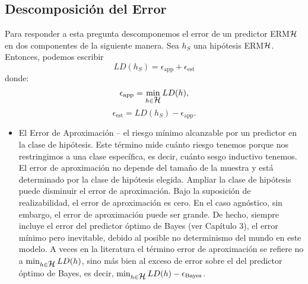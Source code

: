 \begin{teo}
\subsection*{Descomposición del Error}
Para responder a esta pregunta descomponemos el error de un predictor ERM$\mathop{\mbox{$\mathcal{H}$}}\nolimits$ en dos componentes de la siguiente manera. Sea $h_S$ una hipótesis ERM$\mathop{\mbox{$\mathcal{H}$}}\nolimits$. Entonces, podemos escribir
$$ LD(h_S) = \epsilon_{\text{app}} + \epsilon_{\text{est}} $$
donde:
$$ \epsilon_{\text{app}} = \min_{h \in \mathop{\mbox{$\mathcal{H}$}}\nolimits} LD(h), $$
$$ \epsilon_{\text{est}} = LD(h_S) - \epsilon_{\text{app}}. $$
\begin{itemize}
  \item El Error de Aproximación – el riesgo mínimo alcanzable por un predictor en la clase de hipótesis. Este término mide cuánto riesgo tenemos porque nos restringimos a una clase específica, es decir, cuánto sesgo inductivo tenemos. El error de aproximación no depende del tamaño de la muestra y está determinado por la clase de hipótesis elegida. Ampliar la clase de hipótesis puede disminuir el error de aproximación.
  Bajo la suposición de realizabilidad, el error de aproximación es cero. En el caso agnóstico, sin embargo, el error de aproximación puede ser grande.
  De hecho, siempre incluye el error del predictor óptimo de Bayes (ver Capítulo 3), el error mínimo pero inevitable, debido al posible no determinismo del mundo en este modelo. A veces en la literatura el término error de aproximación se refiere no a $\min_{h \in \mathop{\mbox{$\mathcal{H}$}}\nolimits} LD(h)$, sino más bien al exceso de error sobre el del predictor óptimo de Bayes,
  es decir, $\min_{h \in \mathop{\mbox{$\mathcal{H}$}}\nolimits} LD(h) - \epsilon_{\text{Bayes}}$.
  

\end{itemize}
\end{teo}
